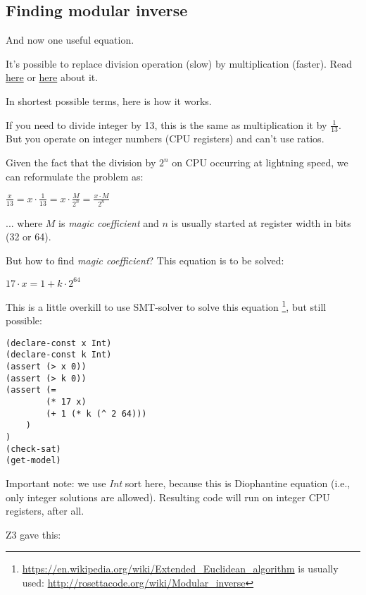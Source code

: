 \subsection{Finding modular inverse}

And now one useful equation.

It's possible to replace division operation (slow) by multiplication (faster).
Read \href{http://beginners.re/15-Nov-2015/Reverse_Engineering_for_Beginners-en.pdf#page=490&zoom=auto,-107,806}{here} or \href{http://yurichev.com/blog/modulo/}{here} about it.

In shortest possible terms, here is how it works.

If you need to divide integer by 13, this is the same as multiplication it by $\frac{1}{13}$.
But you operate on integer numbers (\ac{CPU} registers) and can't use ratios.

Given the fact that the division by $2^n$ on \ac{CPU} occurring at lightning speed, we can reformulate the problem as:

\begin{center}
{\Large $\frac{x}{13} = x \cdot \frac{1}{13} = x \cdot \frac{M}{2^n} = \frac{x \cdot M}{2^n}$ }
\end{center}

... where $M$ is \textit{magic coefficient} and $n$ is usually started at register width in bits (32 or 64).

But how to find \textit{magic coefficient}?
This equation is to be solved:

\begin{center}
{\Large $17 \cdot x = 1+k \cdot 2^{64}$ }
\end{center}

This is a little overkill to use SMT-solver to solve this equation
\footnote{\url{https://en.wikipedia.org/wiki/Extended_Euclidean_algorithm} is usually used:
\url{http://rosettacode.org/wiki/Modular\_inverse}}, but still possible:

\begin{lstlisting}
(declare-const x Int)
(declare-const k Int)
(assert (> x 0))
(assert (> k 0))
(assert (=
		(* 17 x)
		(+ 1 (* k (^ 2 64)))
	)
)
(check-sat)
(get-model)
\end{lstlisting}

Important note: we use \textit{Int} sort here, because this is Diophantine equation (i.e., only integer solutions are allowed).
Resulting code will run on integer \ac{CPU} registers, after all.

Z3 gave this:

